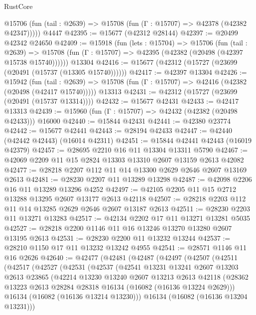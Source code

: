 \begin{lexlean}{RustCore}
\begin{coremodule}
      @15706 (fun (tail : @2639) => @15708 (fun (Γ : @15707) => @42378 (@42382 @42347)))))
    @4447
@42395 := @15677 (@42312 @28144)
@42397 := @20499 @42342 @24650
@42409 := @15918
    (fun (lets : @15704) =>
    @15706
      (fun (tail : @2639) =>
      @15708 (fun (Γ : @15707) => @42395 (@42382 (@20498 (@42397 @15738 @15740))))))
    @13304
@42416 := @15677 (@42312 (@15727 (@23699 (@20491 (@15737 (@13305 @15740))))))
@42417 := @42397 @13304
@42426 := @15942
    (fun (tail : @2639) => @15708 (fun (Γ : @15707) => @42416 (@42382 (@20498 (@42417 @15740)))))
    @13313
@42431 := @42312 (@15727 (@23699 (@20491 (@15737 @13314))))
@42432 := @15677 @42431
@42433 := @42417 @13313
@42439 := @15960 (fun (Γ : @15707) => @42432 (@42382 (@20498 @42433))) @16000
@42440 := @15844 @42431
@42441 := @42380 @23774
@42442 := @15677 @42441
@42443 := @28194 @42433
@42447 := @42440 (@42442 @42443) (@16014 @42311)
@42451 := @15844 @42441 @42443 (@16019 @42379)
@42457 := @28695 @2210 @16 @11 @13304 @13311 @5790
@42467 := @42069 @2209 @11 @15 @2824 @13303 @13310 @2607 @13159 @2613 @42082
@42477 := @28218 @2207 @112 @11 @14 @13300 @2629 @2646 @2607 @13169 @2613
@42481 := @28230 @2207 @11 @13289 @13298
@42487 := @42098 @2206 @16 @11 @13289 @13296 @4252
@42497 := @42105 @2205 @11 @15 @2712 @13288 @13295 @2607 @13177 @2613 @42118
@42507 := @28218 @2203 @112 @11 @14 @13285 @2629 @2646 @2607 @13187 @2613
@42511 := @28230 @2203 @11 @13271 @13283
@42517 := @42134 @2202 @17 @11 @13271 @13281 @5035
@42527 := @28218 @2200 @1146 @11 @16 @13246 @13270 @13280 @2607 @13195 @2613
@42531 := @28230 @2200 @11 @13232 @13244
@42537 := @28210 @1150 @17 @11 @13232 @13242 @4955
@42541 := @28571 @1146 @11 @16 @2626
@42640 := @42477
    (@42481
      (@42487
        (@42497
          (@42507
            (@42511
              (@42517
                (@42527
                  (@42531
                    (@42537
                      (@42541
                        @13231
                        @13241
                        @2607
                        @13203
                        @2613
                        @23865
                        (@42214
                          @13230
                          @13240
                          @2607
                          @13213
                          @2613
                          @42118
                          (@28362 @13223 @2613 @28284 @28318 @16134 (@16082 (@16136 @13224 @2629)))
                          @16134
                          (@16082 (@16136 @13214 @13230)))
                        @16134
                        (@16082 (@16136 @13204 @13231)))

\end{coremodule}
\end{lexlean}
